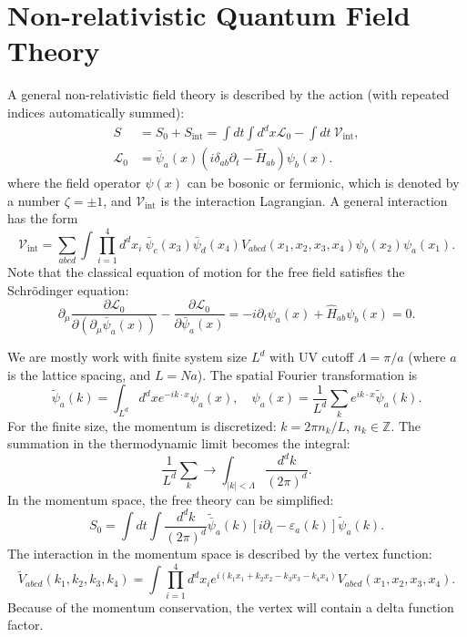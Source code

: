 \chapter{Non-relativistic Quantum Field Theory}
A general non-relativistic field theory is described by the action (with repeated indices automatically summed):
\begin{equation}
\begin{aligned}
	S &= S_0 + S_{\mathrm{int}} = \int dt \int d^d x \mathcal{L}_0 - \int dt\ \mathcal{V}_{\mathrm{int}}, \\
	\mathcal{L}_0 &= \bar\psi_a(x) (i\delta_{ab}\partial_t-\hat H_{ab})\psi_b(x).
\end{aligned}
\end{equation}
where the field operator $\psi(x)$ can be bosonic or fermionic, which is denoted by a number $\zeta=\pm 1$, and $\mathcal{V}_{\mathrm{int}}$ is the interaction Lagrangian.
A general interaction has the form
\begin{equation}
	\mathcal{V}_{\mathrm{int}} = \sum_{abcd}\int \prod_{i=1}^4 d^d x_i \ \bar\psi_{c}(x_3)\bar\psi_{d}(x_4) V_{abcd}(x_1,x_2,x_3,x_4) \psi_{b}(x_2)\psi_{a}(x_1).
\end{equation}
Note that the classical equation of motion for the free field satisfies the Schr\"{o}dinger equation:
\begin{equation}
	\partial_\mu \frac{\partial \mathcal L_0}{\partial(\partial_\mu \bar\psi_a(x))} - \frac{\partial \mathcal L_0}{\partial\bar{\psi}_a(x)} 
	= - i\partial_t \psi_a(x) + \hat H_{ab}\psi_b(x) = 0.
\end{equation}

We are mostly work with finite system size $L^d$ with UV cutoff $\Lambda = \pi/a$ (where $a$ is the lattice spacing, and $L = Na$). The spatial Fourier transformation is
\begin{equation}
	\tilde{\psi}_a(k) = \int_{L^d} d^dx e^{-i k \cdot x}\psi_a(x), \quad
	\psi_a(x) = \frac{1}{L^d}\sum_{k} e^{i k \cdot x}\tilde{\psi}_a(k).
\end{equation}
For the finite size, the momentum is discretized: $k = 2\pi n_k/L$, $n_k \in \mathbb Z$.
The summation in the thermodynamic limit becomes the integral:
\begin{equation}
	\frac{1}{L^d}\sum_k \longrightarrow \int_{|k|<\Lambda} \frac{d^dk}{(2\pi)^d}.
\end{equation}
In the momentum space, the free theory can be simplified:
\begin{equation}
	S_0 = \int dt \int \frac{d^d k}{(2\pi)^d} \tilde{\bar\psi}_a(k) [i\partial_t-\varepsilon_a(k)]\tilde{\psi}_a(k).
\end{equation}
The interaction in the momentum space is described by the vertex function:
\begin{equation}
	\tilde V_{abcd}(k_1,k_2,k_3,k_4)
	= \int \prod_{i=1}^4 d^d x_i e^{i(k_1x_1+k_2x_2-k_3x_3-k_4x_4)} V_{abcd}(x_1,x_2,x_3,x_4).
\end{equation}
Because of the momentum conservation, the vertex will contain a delta function factor.

